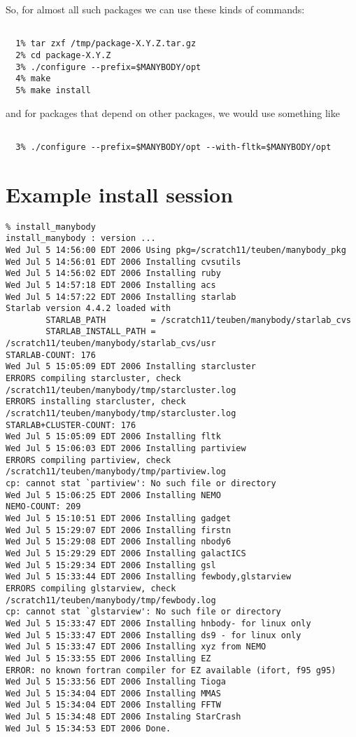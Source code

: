 So, for almost all such packages we can use these kinds of commands:

\footnotesize\begin{verbatim}

  1% tar zxf /tmp/package-X.Y.Z.tar.gz
  2% cd package-X.Y.Z
  3% ./configure --prefix=$MANYBODY/opt
  4% make
  5% make install

\end{verbatim}\normalsize

and for packages that depend on other packages, we would use something like

\footnotesize\begin{verbatim}

  3% ./configure --prefix=$MANYBODY/opt --with-fltk=$MANYBODY/opt

\end{verbatim}\normalsize


\section{Example install session}

\footnotesize\begin{verbatim}
% install_manybody
install_manybody : version ...
Wed Jul 5 14:56:00 EDT 2006 Using pkg=/scratch11/teuben/manybody_pkg
Wed Jul 5 14:56:01 EDT 2006 Installing cvsutils
Wed Jul 5 14:56:02 EDT 2006 Installing ruby
Wed Jul 5 14:57:18 EDT 2006 Installing acs
Wed Jul 5 14:57:22 EDT 2006 Installing starlab
Starlab version 4.4.2 loaded with
        STARLAB_PATH         = /scratch11/teuben/manybody/starlab_cvs
        STARLAB_INSTALL_PATH = /scratch11/teuben/manybody/starlab_cvs/usr
STARLAB-COUNT: 176
Wed Jul 5 15:05:09 EDT 2006 Installing starcluster
ERRORS compiling starcluster, check /scratch11/teuben/manybody/tmp/starcluster.log
ERRORS installing starcluster, check /scratch11/teuben/manybody/tmp/starcluster.log
STARLAB+CLUSTER-COUNT: 176
Wed Jul 5 15:05:09 EDT 2006 Installing fltk
Wed Jul 5 15:06:03 EDT 2006 Installing partiview
ERRORS compiling partiview, check /scratch11/teuben/manybody/tmp/partiview.log
cp: cannot stat `partiview': No such file or directory
Wed Jul 5 15:06:25 EDT 2006 Installing NEMO
NEMO-COUNT: 209
Wed Jul 5 15:10:51 EDT 2006 Installing gadget
Wed Jul 5 15:29:07 EDT 2006 Installing firstn
Wed Jul 5 15:29:08 EDT 2006 Installing nbody6
Wed Jul 5 15:29:29 EDT 2006 Installing galactICS
Wed Jul 5 15:29:34 EDT 2006 Installing gsl
Wed Jul 5 15:33:44 EDT 2006 Installing fewbody,glstarview
ERRORS compiling glstarview, check /scratch11/teuben/manybody/tmp/fewbody.log
cp: cannot stat `glstarview': No such file or directory
Wed Jul 5 15:33:47 EDT 2006 Installing hnbody- for linux only
Wed Jul 5 15:33:47 EDT 2006 Installing ds9 - for linux only
Wed Jul 5 15:33:47 EDT 2006 Installing xyz from NEMO
Wed Jul 5 15:33:55 EDT 2006 Installing EZ
ERROR: no known fortran compiler for EZ available (ifort, f95 g95)
Wed Jul 5 15:33:56 EDT 2006 Installing Tioga
Wed Jul 5 15:34:04 EDT 2006 Installing MMAS
Wed Jul 5 15:34:04 EDT 2006 Installing FFTW
Wed Jul 5 15:34:48 EDT 2006 Instaling StarCrash
Wed Jul 5 15:34:53 EDT 2006 Done.



\end{verbatim}\normalsize

